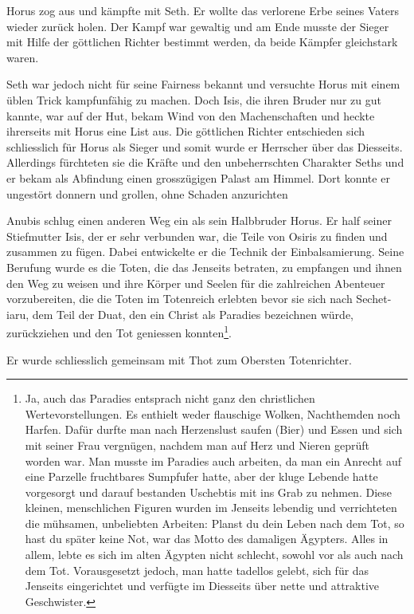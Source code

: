 \documentclass[11pt,titlepage,a5paper]{book}
\begin{document}
Horus zog aus und kämpfte mit Seth. Er wollte das verlorene Erbe seines Vaters wieder zurück holen. Der Kampf war gewaltig und am Ende musste der Sieger mit Hilfe der göttlichen Richter bestimmt werden, da beide Kämpfer gleichstark waren. 

Seth war jedoch nicht für seine Fairness bekannt und versuchte Horus mit einem üblen Trick kampfunfähig zu machen. Doch Isis, die ihren Bruder nur zu gut kannte, war auf der Hut, bekam Wind von den Machenschaften und heckte ihrerseits mit Horus eine List aus. Die göttlichen Richter entschieden sich schliesslich für Horus als Sieger und somit wurde er Herrscher über das Diesseits. Allerdings fürchteten sie die Kräfte und den unbeherrschten Charakter Seths und er bekam als Abfindung einen grosszügigen Palast am Himmel. Dort konnte er ungestört donnern und grollen, ohne Schaden anzurichten

Anubis schlug einen anderen Weg ein als sein Halbbruder Horus. Er half seiner Stiefmutter Isis, der er sehr verbunden war, die Teile von Osiris zu finden und zusammen zu fügen. Dabei entwickelte er die Technik der Einbalsamierung. Seine Berufung wurde es die Toten, die das Jenseits betraten, zu empfangen und ihnen den Weg zu weisen und ihre Körper und Seelen für die zahlreichen Abenteuer vorzubereiten, die die Toten im Totenreich erlebten bevor sie sich nach Sechet-iaru, dem Teil der Duat, den ein Christ als Paradies bezeichnen würde, zurückziehen und den Tot geniessen konnten\footnote{Ja, auch das Paradies entsprach nicht ganz den christlichen Wertevorstellungen. Es enthielt weder flauschige Wolken, Nachthemden noch Harfen. Dafür durfte man nach Herzenslust saufen (Bier) und Essen und sich mit seiner Frau vergnügen, nachdem man auf Herz und Nieren geprüft worden war. Man musste im Paradies auch arbeiten, da man ein Anrecht auf eine Parzelle fruchtbares Sumpfufer hatte, aber der kluge Lebende hatte vorgesorgt und darauf bestanden Uschebtis mit ins Grab zu nehmen. Diese kleinen, menschlichen Figuren wurden im Jenseits lebendig und verrichteten die mühsamen, unbeliebten Arbeiten: Planst du dein Leben nach dem Tot, so hast du später keine Not, war das Motto des damaligen Ägypters. Alles in allem, lebte es sich im alten Ägypten nicht schlecht, sowohl vor als auch nach dem Tot. Vorausgesetzt jedoch, man hatte tadellos gelebt, sich für das Jenseits eingerichtet und verfügte im Diesseits über nette und attraktive Geschwister.}.

Er wurde schliesslich gemeinsam mit Thot zum Obersten Totenrichter. 
\end{document}

